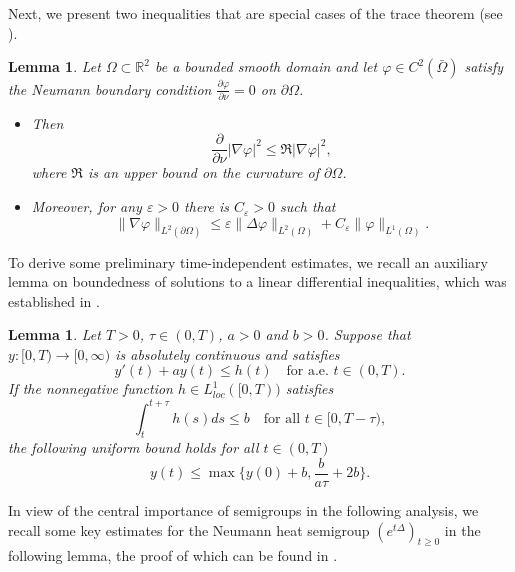 \documentclass[10pt,a4paper]{amsart}
\numberwithin{equation}{section}
\newtheorem{lemma}[theo]{Lemma}
\begin{document}
Next, we present two inequalities that are special cases of the trace theorem 
(see \cite{ma-13}).

\begin{lemma} \label{lem2.2}
Let $\Omega \subset \mathbb{R}^2$  be a bounded smooth domain and let 
$\varphi \in C^2(\bar{\Omega})$ satisfy the Neumann
boundary condition $\frac{\partial \varphi}{\partial \nu} = 0$
on $\partial \Omega$.
\begin{itemize}
\item[(i)] Then
\begin{equation}\label{9.12-3}
\frac{\partial}{\partial\nu }|\nabla \varphi|^2 
\leq \mathfrak{R} |\nabla \varphi|^2,
\end{equation}
where $\mathfrak{R}$ is an upper bound on the curvature of 
$\partial \Omega$.

\item[(ii)] Moreover, for any $\varepsilon > 0$ there is $C_\varepsilon> 0$ such that
\begin{equation}\label{9.12-4}
\|\nabla \varphi\|_{L^2(\partial \Omega)} \leq \varepsilon\|\Delta \varphi\|_{L^2(\Omega)}+C_\varepsilon \|\varphi\|_{L^1(\Omega)}.
\end{equation}
\end{itemize}
\end{lemma}

To derive some preliminary time-independent estimates, we recall an auxiliary lemma 
on boundedness of solutions to a linear differential inequalities,
which was established in \cite{ma-19}.

\begin{lemma}\label{lem2.4}
Let $T>0$, $\tau\in(0,T)$, $a > 0$ and $b>0$. Suppose that $y:[0,T)\to[0,\infty)$ 
is absolutely continuous and satisfies
\[
y'(t)+a y(t)\leq h(t)\quad\text{for a.e. }t\in(0,T).
\]
If the nonnegative function $h\in L^1_{loc}([0,T))$ satisfies
\[
\int_{t}^{t + \tau}h(s)ds\leq b\quad\text{for all }t\in[0,T-\tau),
\]
the following uniform bound holds for all $t\in(0,T)$
\[
y(t)\leq\max\big\{y(0)+b,\frac{b}{a\tau}+2b\big\}.
\]
\end{lemma}

In view of the central importance of semigroups in the following analysis, we recall 
some key estimates for the Neumann heat semigroup
$(e^{t\Delta})_{t\geq0}$ in the following lemma, the proof of which can be found 
in \cite{Cao2015, Horstmann2005,G-10}.
\end{document}
